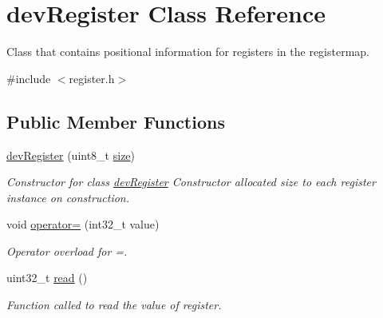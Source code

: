 \hypertarget{classdev_register}{}\section{dev\+Register Class Reference}
\label{classdev_register}


Class that contains positional information for registers in the registermap.  




{\ttfamily \#include $<$register.\+h$>$}

\subsection*{Public Member Functions}
\begin{DoxyCompactItemize}
\item 
\mbox{\hyperlink{classdev_register_a17ac6e4e1ee9a2395e94e0a3c1000caa}{dev\+Register}} (uint8\+\_\+t \mbox{\hyperlink{classdev_register_a6596e86ccbcd857febb5c28bc03aa480}{size}})
\begin{DoxyCompactList}\small\item\em Constructor for class \mbox{\hyperlink{classdev_register}{dev\+Register}} Constructor allocated size to each register instance on construction. \end{DoxyCompactList}\item 
void \mbox{\hyperlink{classdev_register_a944b194a7335c6b0a9f9f3c1ffc12c97}{operator=}} (int32\+\_\+t value)
\begin{DoxyCompactList}\small\item\em Operator overload for \textquotesingle{}=\textquotesingle{}. \end{DoxyCompactList}\item 
uint32\+\_\+t \mbox{\hyperlink{classdev_register_ac7f2e7ec834102cdf3ebd3a6f849612a}{read}} ()
\begin{DoxyCompactList}\small\item\em Function called to read the value of register. \end{DoxyCompactList}\end{DoxyCompactItemize}
